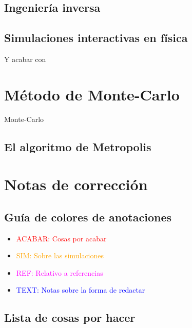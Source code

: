\documentclass[11pt, a4paper]{article} %
\theoremstyle{named}
\begin{document}
    \subsection{Ingeniería inversa}

    \subsection{Simulaciones interactivas en física}

    Y acabar con

\newpage
\appendix
\section{Método de Monte-Carlo}\label{sec:monteC}
     Monte-Carlo

    \subsection{El algoritmo de Metropolis}\label{sec:metropolis}

\nocite{einstein}
\nocite{max}




\newpage
\section{Notas de corrección}

    \subsection{Guía de colores de anotaciones}

    \begin{itemize}
        \item \textcolor{red}{ACABAR: Cosas por acabar}
        \item \textcolor{orange}{SIM: Sobre las simulaciones}
        \item \textcolor{magenta}{REF: Relativo a referencias}
        \item \textcolor{blue}{TEXT: Notas sobre la forma de redactar}
    \end{itemize}

    \subsection{Lista de cosas por hacer}
\end{document}
